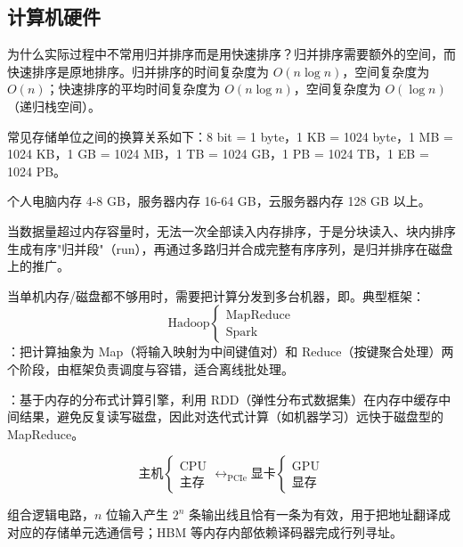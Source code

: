\documentclass[12pt]{article}
\begin{document}
\subsection{计算机硬件}
\begin{note}
  为什么实际过程中不常用归并排序而是用快速排序？归并排序需要额外的空间，而快速排序是原地排序。归并排序的时间复杂度为 $O(n \log n)$，空间复杂度为 $O(n)$；快速排序的平均时间复杂度为 $O(n \log n)$，空间复杂度为 $O(\log n)$（递归栈空间）。
\end{note}
\begin{note}
  常见存储单位之间的换算关系如下：8 bit = 1 byte，1 KB = 1024 byte，1 MB = 1024 KB，1 GB = 1024 MB，1 TB = 1024 GB，1 PB = 1024 TB，1 EB = 1024 PB。

  个人电脑内存 4-8 GB，服务器内存 16-64 GB，云服务器内存 128 GB 以上。
\end{note}
\begin{defn}
  当数据量超过内存容量时，无法一次全部读入内存排序，于是分块读入、块内排序生成有序"归并段"（run），再通过多路归并合成完整有序序列，是归并排序在磁盘上的推广。

  当单机内存/磁盘都不够用时，需要把计算分发到多台机器，即。典型框架：
  \[
    \text{Hadoop}\begin{cases}
      \text{MapReduce} \\
      \text{Spark}
    \end{cases}
  \]
  ：把计算抽象为 Map（将输入映射为中间键值对）和 Reduce（按键聚合处理）两个阶段，由框架负责调度与容错，适合离线批处理。

  ：基于内存的分布式计算引擎，利用 RDD（弹性分布式数据集）在内存中缓存中间结果，避免反复读写磁盘，因此对迭代式计算（如机器学习）远快于磁盘型的 MapReduce。
\end{defn}
\begin{note}
  \[
    \text{主机}\begin{cases}
      \text{CPU} \\
      \text{主存}
    \end{cases}\leftrightarrow_{\text{PCIe}} \text{显卡}\begin{cases}
      \text{GPU} \\
      \text{显存}
    \end{cases}
  \]
\end{note}
\begin{defn}
  组合逻辑电路，$n$ 位输入产生 $2^n$ 条输出线且恰有一条为有效，用于把地址翻译成对应的存储单元选通信号；HBM 等内存内部依赖译码器完成行列寻址。
\end{defn}
\end{document}
